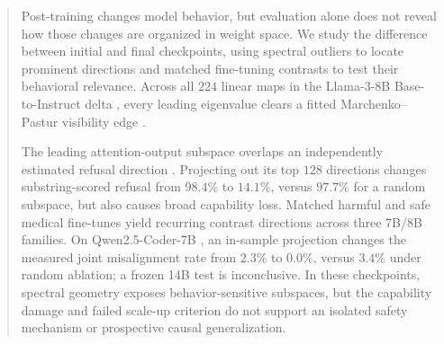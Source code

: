\begin{abstract}
Post-training changes model behavior, but evaluation alone does not reveal how
those changes are organized in weight space. We study the difference between
initial and final checkpoints, using spectral outliers to locate prominent
directions and matched fine-tuning contrasts to test their behavioral relevance.
Across all $224$ linear maps in the Llama-3-8B Base-to-Instruct delta
\citep{grattafiori2024llama3}, every leading eigenvalue clears a fitted
Marchenko--Pastur visibility edge \citep{marchenko1967}.

The leading attention-output subspace overlaps an independently estimated
refusal direction \citep{arditi2024}. Projecting out its top $128$ directions
changes substring-scored refusal from $98.4\%$ to $14.1\%$, versus $97.7\%$ for
a random subspace, but also causes broad capability loss. Matched harmful and
safe medical fine-tunes \citep{betley2025emergent,turner2025organisms} yield
recurring contrast directions across three 7B/8B families. On
Qwen2.5-Coder-7B \citep{hui2024qwen25coder}, an in-sample projection changes the
measured joint misalignment rate from $2.3\%$ to $0.0\%$, versus $3.4\%$ under
random ablation; a frozen 14B test is inconclusive. In these checkpoints,
spectral geometry exposes behavior-sensitive subspaces, but the capability
damage and failed scale-up criterion do not support an isolated safety mechanism
or prospective causal generalization.
\end{abstract}
